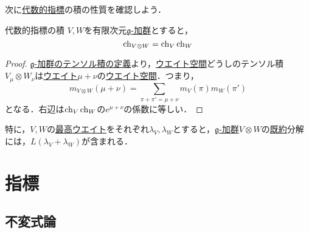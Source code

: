 \documentclass[rep_main]{subfiles}
\begin{document}
次に\hyperref[def:alg-character]{代数的指標}の積の性質を確認しよう．
\begin{myprop}[label=prop:alg-character-multiply]{代数的指標の積}
	$V, W$を有限次元\hyperref[ax:g-module]{$\mathfrak{g}$-加群}とすると，
	\begin{equation}
		\operatorname{ch}_{V \otimes W} = \operatorname{ch}_V\operatorname{ch}_W
	\end{equation}
\end{myprop}
\begin{proof}
	\hyperref[def:gmod-tensor]{$\mathfrak{g}$-加群のテンソル積の定義}より，\hyperref[def:weight-rep]{ウエイト空間}どうしのテンソル積$V_\mu \otimes W_\nu$は\hyperref[def:weight-rep]{ウエイト}$\mu + \nu$の\hyperref[def:weight-rep]{ウエイト空間}．つまり，
	\begin{equation}
		m_{V \otimes W}(\mu + \nu) = \sum_{\pi + \pi' = \mu + \nu} m_V(\pi)m_W(\pi')
	\end{equation}
	となる．右辺は$\operatorname{ch}_V\operatorname{ch}_W$の$e^{\mu + \nu}$の係数に等しい．
\end{proof}
特に，$V, W$の\hyperref[def:highest-weight-module]{最高ウエイト}をそれぞれ$\lambda_V, \lambda_W$とすると，\hyperref[ax:g-module]{$\mathfrak{g}$-加群}$V \otimes W$の\hyperref[def:irr]{既約}分解には，$L(\lambda_V + \lambda_W)$が含まれる．

\section{指標}
\subsection{不変式論}
\end{document}
